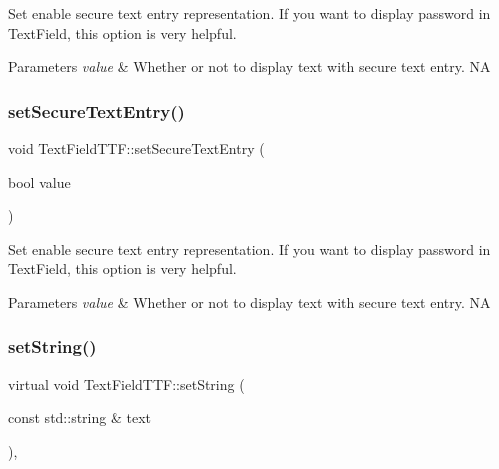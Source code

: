 Set enable secure text entry representation. If you want to display password in Text\+Field, this option is very helpful. 
\begin{DoxyParams}{Parameters}
{\em value} & Whether or not to display text with secure text entry.  NA \\
\hline
\end{DoxyParams}
\mbox{\label{classTextFieldTTF_aee12da5f6c3bbc77ab6d144245f750b5}} 
\subsubsection{\texorpdfstring{set\+Secure\+Text\+Entry()}{setSecureTextEntry()}\hspace{0.1cm}{\footnotesize\ttfamily [2/2]}}
{\footnotesize\ttfamily void Text\+Field\+T\+T\+F\+::set\+Secure\+Text\+Entry (\begin{DoxyParamCaption}\item[{bool}]{value }\end{DoxyParamCaption})\hspace{0.3cm}{\ttfamily [virtual]}}

Set enable secure text entry representation. If you want to display password in Text\+Field, this option is very helpful. 
\begin{DoxyParams}{Parameters}
{\em value} & Whether or not to display text with secure text entry.  NA \\
\hline
\end{DoxyParams}
\mbox{\label{classTextFieldTTF_a0aee071a7df021d656ace9455e2c0b91}} 
\subsubsection{\texorpdfstring{set\+String()}{setString()}\hspace{0.1cm}{\footnotesize\ttfamily [1/2]}}
{\footnotesize\ttfamily virtual void Text\+Field\+T\+T\+F\+::set\+String (\begin{DoxyParamCaption}\item[{const std\+::string \&}]{text }\end{DoxyParamCaption})\hspace{0.3cm}{\ttfamily [override]}, {\ttfamily [virtual]}}

